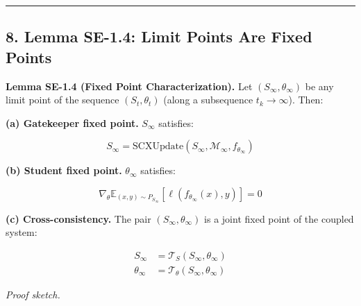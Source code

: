 \documentclass[
  12pt,
]{article}
\begin{document}
\begin{center}\rule{0.5\linewidth}{0.5pt}\end{center}

\subsection{8. Lemma SE-1.4: Limit Points Are Fixed
Points}\label{lemma-se-1.4-limit-points-are-fixed-points}

\textbf{Lemma SE-1.4 (Fixed Point Characterization).} Let
\((S_\infty, \theta_\infty)\) be any limit point of the sequence
\((S_t, \theta_t)\) (along a subsequence \(t_k \to \infty\)). Then:

\textbf{(a) Gatekeeper fixed point.} \(S_\infty\) satisfies:

\[
S_\infty = \text{SCXUpdate}(S_\infty, \mathcal{M}_\infty, f_{\theta_\infty})
\]

\textbf{(b) Student fixed point.} \(\theta_\infty\) satisfies:

\[
\nabla_\theta \mathbb{E}_{(x,y) \sim P_{S_\infty}}[\ell(f_{\theta_\infty}(x), y)] = 0
\]

\textbf{(c) Cross-consistency.} The pair \((S_\infty, \theta_\infty)\)
is a joint fixed point of the coupled system:

\[
\begin{aligned}
S_\infty &= \mathcal{T}_S(S_\infty, \theta_\infty) \\
\theta_\infty &= \mathcal{T}_\theta(S_\infty, \theta_\infty)
\end{aligned}
\]

\emph{Proof sketch.}
\end{document}
